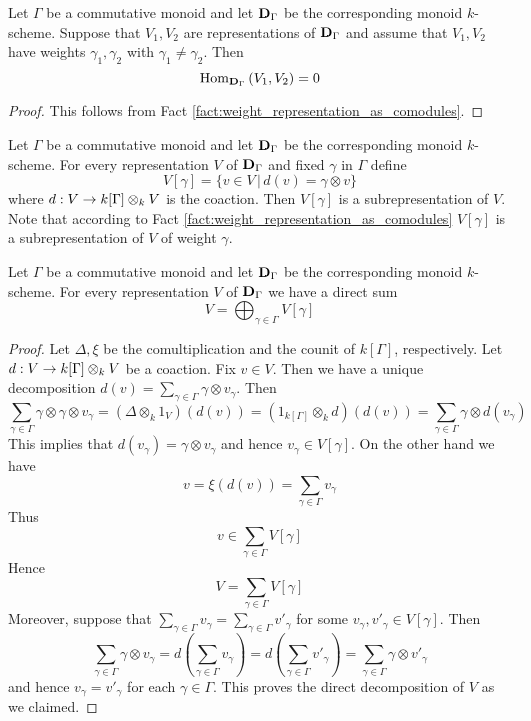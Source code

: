 \begin{fact}\label{fact:othogonality_of_weights_representations}
Let $\Gamma$ be a commutative monoid and let $\mathbf{D}_{\Gamma}$ be the corresponding monoid $k$-scheme. Suppose that $V_1,V_2$ are representations of $\mathbf{D}_{\Gamma}$ and assume that $V_1,V_2$ have weights $\gamma_1, \gamma_2$ with $\gamma_1\neq \gamma_2$. Then
$$\mathrm{Hom}_{\mathbf{D}_{\Gamma}}\left(V_1,V_2\right) = 0$$
\end{fact}
\begin{proof}
This follows from Fact \ref{fact:weight_representation_as_comodules}.
\end{proof}
\noindent
Let $\Gamma$ be a commutative monoid and let $\mathbf{D}_{\Gamma}$ be the corresponding monoid $k$-scheme. For every representation $V$ of $\mathbf{D}_{\Gamma}$ and fixed $\gamma$ in $\Gamma$  define
$$V[\gamma] = \big\{v\in V\,\big|\,d(v) = \gamma \otimes v\big\}$$
where $d:V\rightarrow k[\Gamma]\otimes_kV$ is the coaction. Then $V[\gamma]$ is a subrepresentation of $V$. Note that according to Fact \ref{fact:weight_representation_as_comodules} $V[\gamma]$ is a subrepresentation of $V$ of weight $\gamma$.

\begin{proposition}\label{proposition:weight_decomposition}
Let $\Gamma$ be a commutative monoid and let $\mathbf{D}_{\Gamma}$ be the corresponding monoid $k$-scheme. For every representation $V$ of $\mathbf{D}_{\Gamma}$ we have a direct sum
$$V = \bigoplus_{\gamma \in \Gamma}V[\gamma]$$
\end{proposition}
\begin{proof}
Let $\Delta,\xi$ be the comultiplication and the counit of $k[\Gamma]$, respectively. Let $d:V\rightarrow k[\Gamma]\otimes_k V$ be a coaction. Fix $v\in V$. Then we have a unique decomposition $d(v) = \sum_{\gamma \in \Gamma}\gamma\otimes v_{\gamma}$. Then
$$\sum_{\gamma\in \Gamma}\gamma \otimes \gamma \otimes v_{\gamma}  = \left(\Delta\otimes_k1_V\right)\left(d(v)\right) =  \left(1_{k[\Gamma]}\otimes_kd\right)\left(d(v)\right) = \sum_{\gamma \in \Gamma}\gamma \otimes d(v_{\gamma})$$
This implies that $d(v_{\gamma}) = \gamma \otimes v_{\gamma}$ and hence $v_{\gamma}\in V[\gamma]$. On the other hand we have
$$v =  \xi\left(d(v)\right) = \sum_{\gamma\in \Gamma}v_{\gamma}$$
Thus
$$v \in \sum_{\gamma\in \Gamma}V[\gamma]$$
Hence
$$V =  \sum_{\gamma\in \Gamma}V[\gamma]$$
Moreover, suppose that $\sum_{\gamma\in \Gamma}v_{\gamma} = \sum_{\gamma\in \Gamma}v'_{\gamma}$ for some $v_{\gamma},v'_{\gamma}\in V[\gamma]$. Then
$$\sum_{\gamma\in \Gamma}\gamma\otimes v_{\gamma} = d\left(\sum_{\gamma\in \Gamma}v_{\gamma}\right) = d\left(\sum_{\gamma\in \Gamma}v'_{\gamma}\right) =  \sum_{\gamma\in \Gamma}\gamma \otimes v'_{\gamma}$$
and hence $v_{\gamma} = v'_{\gamma}$ for each $\gamma \in \Gamma$. This proves the direct decomposition of $V$ as we claimed.
\end{proof}


